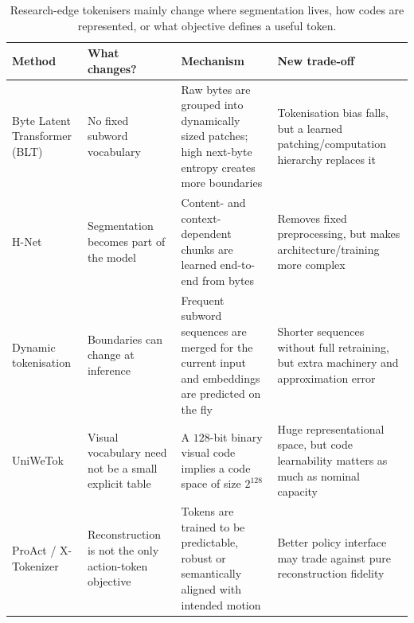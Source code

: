 \begin{table}[htbp]
\centering
\small
\begin{tabular}{p{}p{}p{}p{}}
\hline
\textbf{Method} & \textbf{What changes?} & \textbf{Mechanism} & \textbf{New trade-off} \\
\hline
Byte Latent Transformer (BLT) & No fixed subword vocabulary & Raw bytes are grouped into dynamically sized patches; high next-byte entropy creates more boundaries & Tokenisation bias falls, but a learned patching/computation hierarchy replaces it \\
H-Net & Segmentation becomes part of the model & Content- and context-dependent chunks are learned end-to-end from bytes & Removes fixed preprocessing, but makes architecture/training more complex \\
Dynamic tokenisation & Boundaries can change at inference & Frequent subword sequences are merged for the current input and embeddings are predicted on the fly & Shorter sequences without full retraining, but extra machinery and approximation error \\
UniWeTok & Visual vocabulary need not be a small explicit table & A $128$-bit binary visual code implies a code space of size $2^{128}$ & Huge representational space, but code learnability matters as much as nominal capacity \\
ProAct / X-Tokenizer & Reconstruction is not the only action-token objective & Tokens are trained to be predictable, robust or semantically aligned with intended motion & Better policy interface may trade against pure reconstruction fidelity \\
\hline
\end{tabular}
\caption{Research-edge tokenisers mainly change where segmentation lives, how codes are represented, or what objective defines a useful token.}
\label{tab:tokeniser-frontier}
\end{table}

